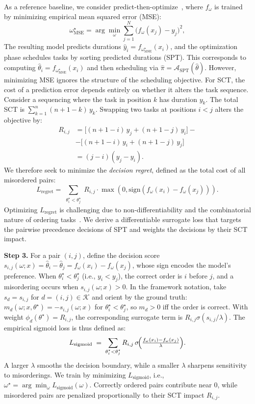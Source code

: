 \documentclass{article}
\begin{document}
As a reference baseline, we consider predict-then-optimize~\cite{Mandi2020}, where $f_\omega$ is trained by minimizing empirical mean squared error (MSE):
\begin{equation}
\omega^\star_{\mathrm{MSE}}
=
\arg\min_{\omega} \sum_{j=1}^{N} \bigl(f_\omega(x_j) - y_j\bigr)^2,
\end{equation}
The resulting model predicts durations $\hat{y}_i=f_{\omega^\star_{\mathrm{MSE}}}(x_i)$,
and the optimization phase schedules tasks by sorting predicted durations (SPT).
This corresponds to computing $\hat{\theta}_i=f_{\omega^\star_{\mathrm{MSE}}}(x_i)$ and then scheduling via $\hat{\pi}=\mathcal{A}_{\mathrm{SPT}}(\hat{\theta})$. However, minimizing MSE ignores the structure of the scheduling objective.
For SCT, the cost of a prediction error depends entirely on whether it alters the task sequence.
Consider a sequencing where the task in position $k$ has duration $y_k$. The total SCT is $\sum_{k=1}^n (n+1-k) \, y_k$.
Swapping two tasks at positions $i < j$ alters the objective by:
\begin{align}
R_{i,j} &= \big[(n{+}1{-}i)\, y_j + (n{+}1{-}j)\, y_i\big] -\\
&- \big[(n{+}1{-}i)\, y_i + (n{+}1{-}j)\, y_j\big] \nonumber \\
       &= (j - i)(y_j - y_i).
\end{align}
We therefore seek to minimize the \emph{decision regret}, 
defined as the total cost of all misordered pairs:
$$L_{\text{regret}} = \sum_{\substack{\theta_i^\star < \theta_j^\star}} R_{i,j} \cdot \max(0, \text{sign}(f_\omega(x_i) - f_\omega(x_j))).$$ Optimizing $L_{\text{regret}}$ is challenging due to non-differentiability and the combinatorial nature of ordering tasks~\cite{elmachtoub2022smart}.
We derive a differentiable surrogate loss that targets the
pairwise precedence decisions of SPT and weights the decisions by their SCT
impact.

\noindent\textbf{Step 3.}
For a pair $(i,j)$, define the decision score
\(
s_{i,j}(\omega;x)= \hat{\theta}_i-\hat{\theta}_j = f_\omega(x_i)-f_\omega(x_j)
\),
whose sign encodes the model's preference.
When $\theta_i^\star<\theta_j^\star$ (i.e., $y_i<y_j$), the correct order is
$i$ before $j$, and a misordering occurs
when $s_{i,j}(\omega;x)>0$.
In the framework notation, take $s_d=s_{i,j}$ for $d=(i,j)\in\mathcal{K}$ and orient by the ground truth:
\(
m_d(\omega;x,\theta^\star)=-s_{i,j}(\omega;x)
\)
for $\theta_i^\star<\theta_j^\star$, so $m_d>0$ iff the order is correct.
With weight $\phi_d(\theta^\star)=R_{i,j}$, the corresponding surrogate term is $R_{i,j}\sigma(s_{i,j}/\lambda)$.
The empirical sigmoid loss is thus defined as:
\begin{equation}
L_{\text{sigmoid}}
\;=\;
\sum_{\substack{\theta_i^\star < \theta_j^\star}}
  R_{i,j}\,
  \sigma\!\Bigl( \tfrac{f_\omega(x_i) - f_\omega(x_j)}{\lambda} \Bigr).
\end{equation}
A larger \(\lambda\) smooths the decision boundary, while a smaller \(\lambda\) sharpens sensitivity to misorderings.
We train by minimizing $L_{\text{sigmoid}}$, i.e., $\omega^\star = \arg\min_{\omega} L_{\text{sigmoid}}(\omega)$. Correctly ordered pairs contribute near $0$, while misordered pairs are penalized proportionally to their SCT impact $R_{i,j}$.
\end{document}

